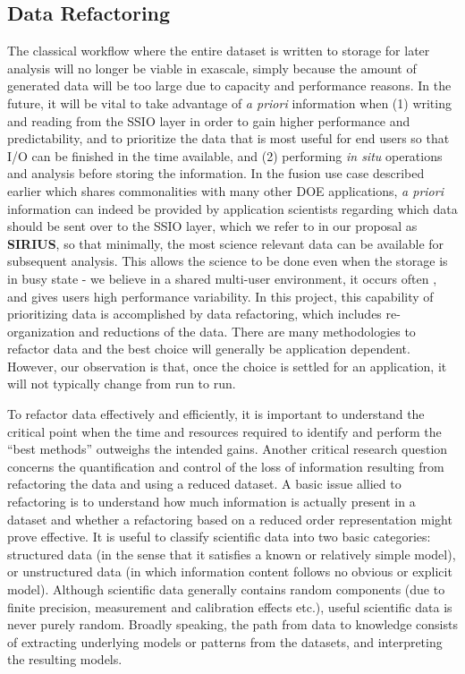 \subsection{Data Refactoring} \label{sec:data-refactor} 

The classical workflow where the entire dataset is written to storage for
later analysis will no longer be viable in exascale, simply because the amount of generated data will 
be too large due to capacity and performance reasons.
In the future, it will be vital to take advantage of \textit{a priori}
information when (1) writing and reading from the SSIO layer in order to gain
higher performance and predictability, and to prioritize the data that
is most useful for end users so that I/O can be finished in the time available, and (2)
performing {\em in situ} operations and analysis before storing the information.
In the fusion use case described earlier which shares commonalities with many other
DOE applications, \textit{a priori} information can indeed be provided by application
scientists regarding which data should be sent over to the SSIO layer, which we refer
to in our proposal as {\bf SIRIUS}, so that
minimally, the most science relevant data can be available for subsequent analysis.
This allows the science to be done even when the storage is in busy state - we believe
in a shared multi-user environment, it occurs often \cite{liu_hotstorage}, and gives users
high performance variability.
In this project, this capability of prioritizing data is accomplished by data refactoring, 
which includes re-organization and reductions of the data.
There are many methodologies to refactor data and the best choice will generally
be application dependent. However, our observation is that, once the choice is settled for an application, 
it will not typically change from run to run. 

To refactor data effectively and efficiently, it is important to understand
the critical point when the time and resources required to
identify and perform the ``best methods'' outweighs the intended gains. Another
critical research question concerns the quantification and control of the loss
of information resulting from refactoring the data and using a reduced dataset. 
A basic issue allied to refactoring is to understand how much information is
actually present in a dataset and whether a refactoring based on a reduced
order representation might prove effective. It is useful to classify scientific
data into two basic categories: structured data (in the sense that it satisfies
a known or relatively simple model), or unstructured data (in which information
content follows no obvious or explicit model).  Although scientific data
generally contains random components (due to finite precision, measurement and
calibration effects etc.), useful scientific data is never purely random.
Broadly speaking, the path from data to knowledge consists of extracting
underlying models or patterns from the datasets, and interpreting the resulting
models. 

